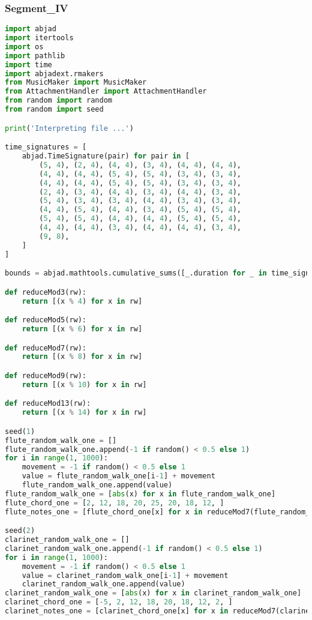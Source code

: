 \subsubsection{Segment\_IV}
\singlespace
\begin{lstlisting}[language=Python, caption=Tianshu Segment\_IV]
import abjad
import itertools
import os
import pathlib
import time
import abjadext.rmakers
from MusicMaker import MusicMaker
from AttachmentHandler import AttachmentHandler
from random import random
from random import seed

print('Interpreting file ...')

time_signatures = [
    abjad.TimeSignature(pair) for pair in [
        (5, 4), (2, 4), (4, 4), (3, 4), (4, 4), (4, 4),
        (4, 4), (4, 4), (5, 4), (5, 4), (3, 4), (3, 4),
        (4, 4), (4, 4), (5, 4), (5, 4), (3, 4), (3, 4),
        (2, 4), (3, 4), (4, 4), (3, 4), (4, 4), (3, 4),
        (5, 4), (3, 4), (3, 4), (4, 4), (3, 4), (3, 4),
        (4, 4), (5, 4), (4, 4), (3, 4), (5, 4), (5, 4),
        (5, 4), (5, 4), (4, 4), (4, 4), (5, 4), (5, 4),
        (4, 4), (4, 4), (3, 4), (4, 4), (4, 4), (3, 4),
        (9, 8),
    ]
]

bounds = abjad.mathtools.cumulative_sums([_.duration for _ in time_signatures])

def reduceMod3(rw):
    return [(x % 4) for x in rw]

def reduceMod5(rw):
    return [(x % 6) for x in rw]

def reduceMod7(rw):
    return [(x % 8) for x in rw]

def reduceMod9(rw):
    return [(x % 10) for x in rw]

def reduceMod13(rw):
    return [(x % 14) for x in rw]

seed(1)
flute_random_walk_one = []
flute_random_walk_one.append(-1 if random() < 0.5 else 1)
for i in range(1, 1000):
    movement = -1 if random() < 0.5 else 1
    value = flute_random_walk_one[i-1] + movement
    flute_random_walk_one.append(value)
flute_random_walk_one = [abs(x) for x in flute_random_walk_one]
flute_chord_one = [2, 12, 18, 20, 25, 20, 18, 12, ]
flute_notes_one = [flute_chord_one[x] for x in reduceMod7(flute_random_walk_one)]

seed(2)
clarinet_random_walk_one = []
clarinet_random_walk_one.append(-1 if random() < 0.5 else 1)
for i in range(1, 1000):
    movement = -1 if random() < 0.5 else 1
    value = clarinet_random_walk_one[i-1] + movement
    clarinet_random_walk_one.append(value)
clarinet_random_walk_one = [abs(x) for x in clarinet_random_walk_one]
clarinet_chord_one = [-5, 2, 12, 18, 20, 18, 12, 2, ]
clarinet_notes_one = [clarinet_chord_one[x] for x in reduceMod7(clarinet_random_walk_one)]


\end{lstlisting}
